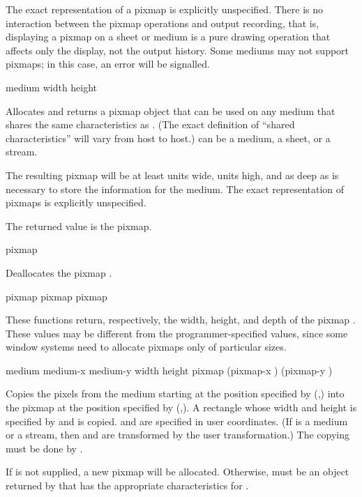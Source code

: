 The exact representation of a pixmap is explicitly unspecified.  There
is no interaction between the pixmap operations and output recording,
that is, displaying a pixmap on a sheet or medium is a pure drawing
operation that affects only the display, not the output history.  Some
mediums may not support pixmaps; in this case, an error will be
signalled.


 {medium width height}

Allocates and returns a pixmap object that can be used on any medium that shares
the same characteristics as .  (The exact definition of ``shared
characteristics'' will vary from host to host.)   can be a medium, a
sheet, or a stream.

The resulting pixmap will be at least  units wide,  units
high, and as deep as is necessary to store the information for the medium.  The
exact representation of pixmaps is explicitly unspecified.

The returned value is the pixmap.

 {pixmap}

Deallocates the pixmap .


  {pixmap}
 {pixmap}
  {pixmap}

These functions return, respectively, the width, height, and depth of the pixmap
.  These values may be different from the programmer-specified
values, since some window systems need to allocate pixmaps only of particular
sizes.


 {medium medium-x medium-y width height
                         \optional pixmap (pixmap-x ) (pixmap-y )}

Copies the pixels from the medium  starting at the position specified
by (,) into the pixmap  at the position
specified by (,).  A rectangle whose width and
height is specified by  and  is copied.  
and  are specified in user coordinates.  (If  is a
medium or a stream, then  and  are transformed by the
user transformation.)  The copying must be done by .

If  is not supplied, a new pixmap will be allocated.  Otherwise,
 must be an object returned by  that has the
appropriate characteristics for . 

